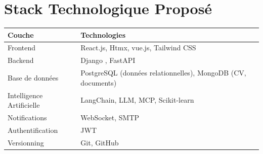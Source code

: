 \documentclass[11pt,a4paper]{report}
\begin{document}
\section{Stack Technologique Proposé}

\begin{tcolorbox}[enhanced, colback=lightgray, colframe=primarycolor, arc=3mm, boxrule=1pt, breakable]
    \begin{tabular}{|p{4cm}|p{9cm}|}
        \hline
        \rowcolor{primarycolor!20}
        \textbf{Couche}           & \textbf{Technologies} \\
        \hline
        Frontend                  & React.js, Htmx, vue.js, Tailwind CSS \\
        \hline
        Backend                   & Django , FastAPI \\
        \hline
        Base de données           & PostgreSQL (données relationnelles), MongoDB (CV, documents) \\
        \hline
        Intelligence Artificielle & LangChain, LLM, MCP, Scikit-learn \\
        \hline
        Notifications             & WebSocket, SMTP \\
        \hline
        Authentification          & JWT \\
        \hline
        Versionning               & Git, GitHub \\
        \hline
    \end{tabular}
\end{tcolorbox}
\end{document}
